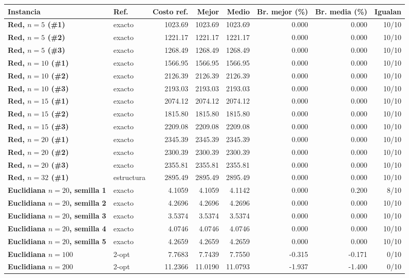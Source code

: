 \renewcommand{\arraystretch}{1.2}
\begin{tabular}{|l|l|r|r|r|r|r|r|}
\hline
\rowcolor{gray!20} \textbf{Instancia} & \textbf{Ref.} & \textbf{Costo ref.} & \textbf{Mejor} & \textbf{Medio} & \textbf{Br. mejor (\%)} & \textbf{Br. media (\%)} & \textbf{Igualan} \\
\hline
\textbf{Red, $n=5$ (\#1)} & exacto & 1023.69 & 1023.69 & 1023.69 & 0.000 & 0.000 & 10/10 \\
\hline
\textbf{Red, $n=5$ (\#2)} & exacto & 1221.17 & 1221.17 & 1221.17 & 0.000 & 0.000 & 10/10 \\
\hline
\textbf{Red, $n=5$ (\#3)} & exacto & 1268.49 & 1268.49 & 1268.49 & 0.000 & 0.000 & 10/10 \\
\hline
\textbf{Red, $n=10$ (\#1)} & exacto & 1566.95 & 1566.95 & 1566.95 & 0.000 & 0.000 & 10/10 \\
\hline
\textbf{Red, $n=10$ (\#2)} & exacto & 2126.39 & 2126.39 & 2126.39 & 0.000 & 0.000 & 10/10 \\
\hline
\textbf{Red, $n=10$ (\#3)} & exacto & 2193.03 & 2193.03 & 2193.03 & 0.000 & 0.000 & 10/10 \\
\hline
\textbf{Red, $n=15$ (\#1)} & exacto & 2074.12 & 2074.12 & 2074.12 & 0.000 & 0.000 & 10/10 \\
\hline
\textbf{Red, $n=15$ (\#2)} & exacto & 1815.80 & 1815.80 & 1815.80 & 0.000 & 0.000 & 10/10 \\
\hline
\textbf{Red, $n=15$ (\#3)} & exacto & 2209.08 & 2209.08 & 2209.08 & 0.000 & 0.000 & 10/10 \\
\hline
\textbf{Red, $n=20$ (\#1)} & exacto & 2345.39 & 2345.39 & 2345.39 & 0.000 & 0.000 & 10/10 \\
\hline
\textbf{Red, $n=20$ (\#2)} & exacto & 2300.39 & 2300.39 & 2300.39 & 0.000 & 0.000 & 10/10 \\
\hline
\textbf{Red, $n=20$ (\#3)} & exacto & 2355.81 & 2355.81 & 2355.81 & 0.000 & 0.000 & 10/10 \\
\hline
\textbf{Red, $n=32$ (\#1)} & estructura & 2895.49 & 2895.49 & 2895.49 & 0.000 & 0.000 & 10/10 \\
\hline
\textbf{Euclidiana $n=20$, semilla 1} & exacto & 4.1059 & 4.1059 & 4.1142 & 0.000 & 0.200 & 8/10 \\
\hline
\textbf{Euclidiana $n=20$, semilla 2} & exacto & 4.2696 & 4.2696 & 4.2696 & 0.000 & 0.000 & 10/10 \\
\hline
\textbf{Euclidiana $n=20$, semilla 3} & exacto & 3.5374 & 3.5374 & 3.5374 & 0.000 & 0.000 & 10/10 \\
\hline
\textbf{Euclidiana $n=20$, semilla 4} & exacto & 4.0746 & 4.0746 & 4.0746 & 0.000 & 0.000 & 10/10 \\
\hline
\textbf{Euclidiana $n=20$, semilla 5} & exacto & 4.2659 & 4.2659 & 4.2659 & 0.000 & 0.000 & 10/10 \\
\hline
\textbf{Euclidiana $n=100$} & 2-opt & 7.7683 & 7.7439 & 7.7550 & -0.315 & -0.171 & 0/10 \\
\hline
\textbf{Euclidiana $n=200$} & 2-opt & 11.2366 & 11.0190 & 11.0793 & -1.937 & -1.400 & 0/10 \\
\hline
\end{tabular}
